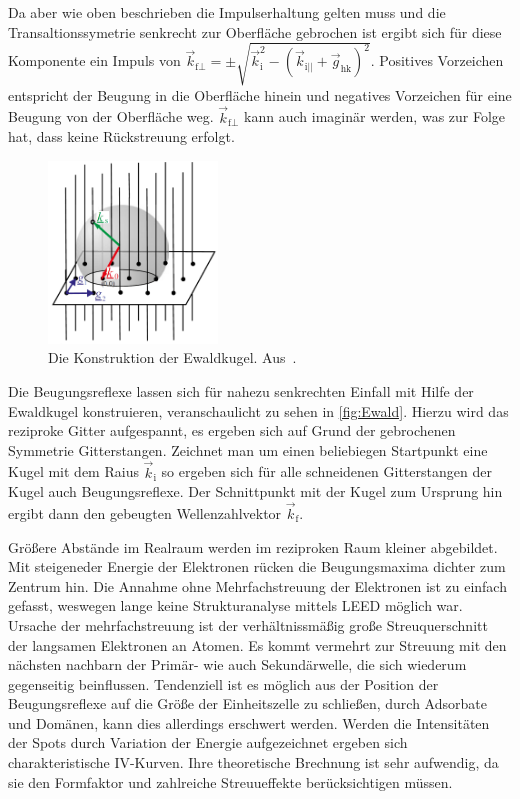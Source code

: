         Da aber wie oben beschrieben die Impulserhaltung gelten muss und die Transaltionssymetrie senkrecht zur Oberfläche gebrochen ist ergibt sich für diese Komponente ein Impuls von $\vec{k}_{\text{f}\perp} = \pm \sqrt{\vec{k}_\text{i}^2 - (\vec{k}_{\text{i}||} + \vec{g}_\text{hk})^2}$.
        Positives Vorzeichen entspricht der Beugung in die Oberfläche hinein und negatives Vorzeichen für eine Beugung von der Oberfläche weg.
        $\vec{k}_{\text{f}\perp}$ kann auch imaginär werden, was zur Folge hat, dass keine Rückstreuung erfolgt.
        \begin{figure}
            \centering
            \includegraphics[width=0.4\textwidth]{./content/Ewald}
            \caption{Die Konstruktion der Ewaldkugel. Aus~\cite{Fauster}.}
            \label{fig:Ewald}
        \end{figure}
        Die Beugungsreflexe lassen sich für nahezu senkrechten Einfall mit Hilfe der Ewaldkugel konstruieren, veranschaulicht zu sehen in \autoref{fig:Ewald}.
        Hierzu wird das reziproke Gitter aufgespannt, es ergeben sich auf Grund der gebrochenen Symmetrie Gitterstangen.
        Zeichnet man um einen beliebiegen Startpunkt eine Kugel mit dem Raius $\vec{k}_\text{i}$ so ergeben sich für alle schneidenen Gitterstangen der Kugel auch Beugungsreflexe.
        Der Schnittpunkt mit der Kugel zum Ursprung hin ergibt dann den gebeugten Wellenzahlvektor $\vec{k}_\text{f}$.

        Größere Abstände im Realraum werden im reziproken Raum kleiner abgebildet.
        Mit steigeneder Energie der Elektronen rücken die Beugungsmaxima dichter zum Zentrum hin.
        Die Annahme ohne Mehrfachstreuung der Elektronen ist zu einfach gefasst, weswegen lange keine Strukturanalyse mittels LEED möglich war.
        Ursache der mehrfachstreuung ist der verhältnissmäßig große Streuquerschnitt der langsamen Elektronen an Atomen.
        Es kommt vermehrt zur Streuung mit den nächsten nachbarn der Primär- wie auch Sekundärwelle, die sich wiederum gegenseitig beinflussen.
        Tendenziell ist es möglich aus der Position der Beugungsreflexe auf die Größe der Einheitszelle zu schließen, durch Adsorbate und Domänen, kann dies allerdings erschwert werden.
        Werden die Intensitäten der Spots durch Variation der Energie aufgezeichnet ergeben sich charakteristische IV-Kurven.
        Ihre theoretische Brechnung ist sehr aufwendig, da sie den Formfaktor und zahlreiche Streuueffekte berücksichtigen müssen.

